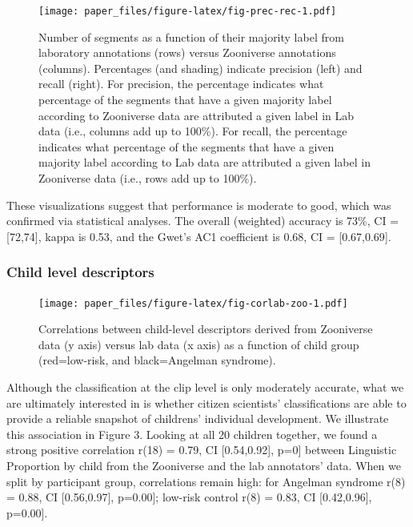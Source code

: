 \documentclass[english,,man,floatsintext]{apa6}
\begin{document}
\begin{figure}
\centering
\texttt{[image: paper\_files/figure-latex/fig-prec-rec-1.pdf]}
\caption{\label{fig:fig-prec-rec}Number of segments as a function of their majority label from laboratory annotations (rows) versus Zooniverse annotations (columns). Percentages (and shading) indicate precision (left) and recall (right). For precision, the percentage indicates what percentage of the segments that have a given majority label according to Zooniverse data are attributed a given label in Lab data (i.e., columns add up to 100\%). For recall, the percentage indicates what percentage of the segments that have a given majority label according to Lab data are attributed a given label in Zooniverse data (i.e., rows add up to 100\%).}
\end{figure}

These visualizations suggest that performance is moderate to good, which was confirmed via statistical analyses. The overall (weighted) accuracy is 73\%, CI = {[}72,74{]}, kappa is 0.53, and the Gwet's AC1 coefficient is 0.68, CI = {[}0.67,0.69{]}.

\hypertarget{child-level-descriptors}{%
\subsubsection{Child level descriptors}\label{child-level-descriptors}}

\begin{figure}
\centering
\texttt{[image: paper\_files/figure-latex/fig-corlab-zoo-1.pdf]}
\caption{\label{fig:fig-corlab-zoo}Correlations between child-level descriptors derived from Zooniverse data (y axis) versus lab data (x axis) as a function of child group (red=low-risk, and black=Angelman syndrome).}
\end{figure}

Although the classification at the clip level is only moderately accurate, what we are ultimately interested in is whether citizen scientists' classifications are able to provide a reliable snapshot of childrens' individual development. We illustrate this association in Figure 3. Looking at all 20 children together, we found a strong positive correlation r(18) = 0.79, CI {[}0.54,0.92{]}, p=0{]} between Linguistic Proportion by child from the Zooniverse and the lab annotators' data. When we split by participant group, correlations remain high: for Angelman syndrome r(8) = 0.88, CI {[}0.56,0.97{]}, p=0.00{]}; low-risk control r(8) = 0.83, CI {[}0.42,0.96{]}, p=0.00{]}.
\end{document}
